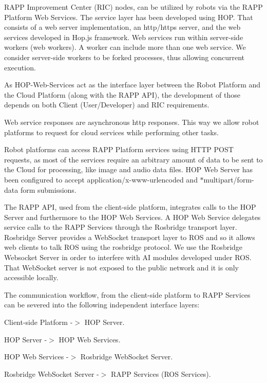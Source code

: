 R\-A\-P\-P Improvement Center (R\-I\-C) nodes, can be utilized by robots via the R\-A\-P\-P Platform Web Services. The service layer has been developed using H\-O\-P. That consists of a web server implementation, an http/https server, and the web services developed in Hop.\-js framework. Web services run within server-\/side workers (web workers). A worker can include more than one web service. We consider server-\/side workers to be forked processes, thus allowing concurrent execution.

As H\-O\-P-\/\-Web-\/\-Services act as the interface layer between the Robot Platform and the Cloud Platform (along with the R\-A\-P\-P A\-P\-I), the development of those depends on both Client (User/\-Developer) and R\-I\-C requirements.

Web service responses are asynchronous http responses. This way we allow robot platforms to request for cloud services while performing other tasks.

Robot platforms can access R\-A\-P\-P Platform services using H\-T\-T\-P P\-O\-S\-T requests, as most of the services require an arbitrary amount of data to be sent to the Cloud for processing, like image and audio data files. H\-O\-P Web Server has been configured to accept application/x-\/www-\/urlencoded and $\ast$multipart/form-\/data form submissions.

The R\-A\-P\-P A\-P\-I, used from the client-\/side platform, integrates calls to the H\-O\-P Server and furthermore to the H\-O\-P Web Services. A H\-O\-P Web Service delegates service calls to the R\-A\-P\-P Services through the Rosbridge transport layer. Rosbridge Server provides a Web\-Socket transport layer to R\-O\-S and so it allows web clients to talk R\-O\-S using the rosbridge protocol. We use the Rosbridge Websocket Server in order to interfere with A\-I modules developed under R\-O\-S. That Web\-Socket server is not exposed to the public network and it is only accessible locally.

The communication workflow, from the client-\/side platform to R\-A\-P\-P Services can be severed into the following independent interface layers\-:


\begin{DoxyItemize}
\item Client-\/side Platform -\/$>$ H\-O\-P Server.
\item H\-O\-P Server -\/$>$ H\-O\-P Web Services.
\item H\-O\-P Web Services -\/$>$ Rosbridge Web\-Socket Server.
\item Rosbridge Web\-Socket Server -\/$>$ R\-A\-P\-P Services (R\-O\-S Services).
\end{DoxyItemize}

